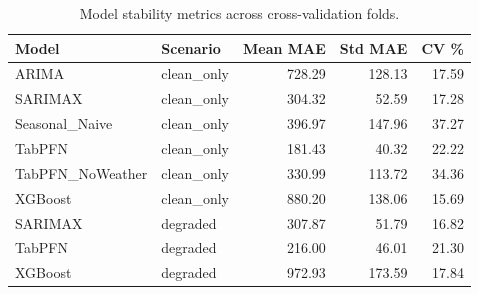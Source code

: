 \begin{table}[h]
\centering
\begin{tabular}{llrrr}
\toprule
Model & Scenario & Mean MAE & Std MAE & CV \% \\
\midrule
ARIMA & clean\_only & 728.29 & 128.13 & 17.59 \\
SARIMAX & clean\_only & 304.32 & 52.59 & 17.28 \\
Seasonal_Naive & clean\_only & 396.97 & 147.96 & 37.27 \\
TabPFN & clean\_only & 181.43 & 40.32 & 22.22 \\
TabPFN_NoWeather & clean\_only & 330.99 & 113.72 & 34.36 \\
XGBoost & clean\_only & 880.20 & 138.06 & 15.69 \\
SARIMAX & degraded & 307.87 & 51.79 & 16.82 \\
TabPFN & degraded & 216.00 & 46.01 & 21.30 \\
XGBoost & degraded & 972.93 & 173.59 & 17.84 \\
\bottomrule
\end{tabular}
\caption{Model stability metrics across cross-validation folds.}
\label{tab:stability}
\end{table}
